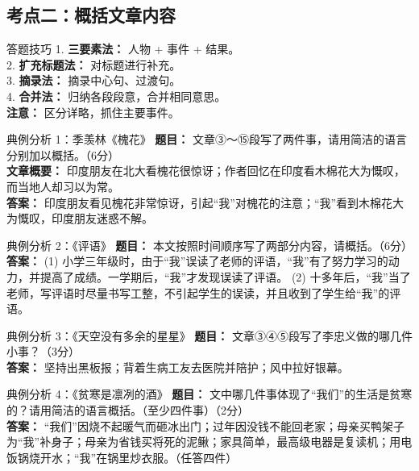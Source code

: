 \documentclass[11pt, a4paper]{ctexart}
\begin{document}
\subsection{考点二：概括文章内容}

\begin{tipsbox}{答题技巧}
1. \textbf{三要素法：} 人物 + 事件 + 结果。\\
2. \textbf{扩充标题法：} 对标题进行补充。\\
3. \textbf{摘录法：} 摘录中心句、过渡句。\\
4. \textbf{合并法：} 归纳各段段意，合并相同意思。\\
\textbf{注意：} 区分详略，抓住主要事件。
\end{tipsbox}

\begin{examplebox}{典例分析 1：季羡林《槐花》}
\textbf{题目：} 文章③～⑮段写了两件事，请用简洁的语言分别加以概括。（6分）\\
\textbf{文章概要：} 印度朋友在北大看槐花很惊讶；作者回忆在印度看木棉花大为慨叹，而当地人却习以为常。\\
\textbf{答案：} 印度朋友看见槐花非常惊讶，引起“我”对槐花的注意；“我”看到木棉花大为慨叹，印度朋友迷惑不解。
\end{examplebox}

\begin{examplebox}{典例分析 2：《评语》}
\textbf{题目：} 本文按照时间顺序写了两部分内容，请概括。（6分）\\
\textbf{答案：}
(1) 小学三年级时，由于“我”误读了老师的评语，“我”有了努力学习的动力，并提高了成绩。一学期后，“我”才发现误读了评语。
(2) 十多年后，“我”当了老师，写评语时尽量书写工整，不引起学生的误读，并且收到了学生给“我”的评语。
\end{examplebox}

\begin{examplebox}{典例分析 3：《天空没有多余的星星》}
\textbf{题目：} 文章③④⑤段写了李忠义做的哪几件小事？（3分）\\
\textbf{答案：} 坚持出黑板报；背着生病工友去医院并陪护；风中拉好银幕。
\end{examplebox}

\begin{examplebox}{典例分析 4：《贫寒是凛冽的酒》}
\textbf{题目：} 文中哪几件事体现了“我们”的生活是贫寒的？请用简洁的语言概括。（至少四件事）（2分）\\
\textbf{答案：} “我们”因烧不起暖气而砸冰出门；过年因没钱不能回老家；母亲买鸭架子为“我”补身子；母亲为省钱买将死的泥鳅；家具简单，最高级电器是复读机；用电饭锅烧开水；“我”在锅里炒衣服。（任答四件）
\end{examplebox}
\end{document}
